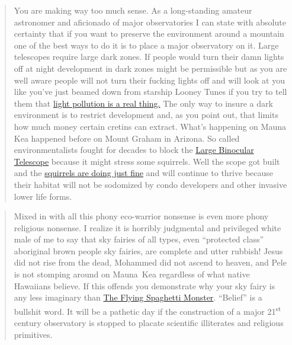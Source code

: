 \begin{quote}
You are making way too much sense. As a long-standing amateur astronomer
and aficionado of major observatories I can state with absolute
certainty that if you want to preserve the environment around a mountain
one of the best ways to do it is to place a major observatory on it.
Large telescopes require large dark zones. If people would turn their
damn lights off at night development in dark zones might be permissible
but as you are well aware people will not turn their fucking lights off
and will look at you like you've just beamed down from starship Looney
Tunes if you try to tell them that \href{http://www.darksky.org/}{light
pollution is a real thing.} The only way to insure a dark environment is
to restrict development and, as you point out, that limits how much
money certain cretins can extract. What's happening on Mauna Kea
happened before on Mount Graham in Arizona. So called environmentalists
fought for decades to block the \href{http://www.lbto.org/}{Large
Binocular Telescope} because it might stress some squirrels. Well the
scope got built and the
\href{http://mgio.arizona.edu/sites/mgio/files/mgrscensus2010.pdf}{squirrels
are doing just fine} and will continue to thrive because their habitat
will not be sodomized by condo developers and other invasive lower life
forms.
\end{quote}

\begin{quote}
Mixed in with all this phony eco-warrior nonsense is even more phony
religious nonsense. I realize it is horribly judgmental and privileged
white male of me to say that sky fairies of all types, even ``protected
class'' aboriginal brown people sky fairies, are complete and utter
rubbish! Jesus did not rise from the dead, Mohammed did not ascend to
heaven, and Pele is not stomping around on Mauna~Kea regardless of what
native Hawaiians believe. If this offends you demonstrate why your sky
fairy is any less imaginary than \href{http://www.venganza.org/}{The
Flying Spaghetti Monster}. ``Belief'' is a bullshit word. It will be a
pathetic day if the construction of a major 21\textsuperscript{st}
century observatory is stopped to placate scientific illiterates and
religious primitives.
\end{quote}




%